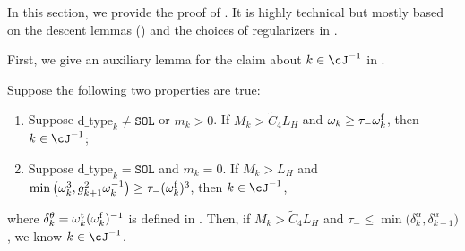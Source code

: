 In this section, we provide the proof of . 
It is highly technical but mostly based on the descent lemmas () and the choices of regularizers in .

First, we give an auxiliary lemma for the claim about $k \in \cJ^{-1}$ in . 
\begin{lemma}
    \label{lem:appendix/decreasing-Mk-condition}
    Suppose the following two properties are true:
    \begin{enumerate}
        \item Suppose $\text{d\_type}_k \neq \texttt{SOL}$ or $m_k > 0$. %
        If $M_k > \tilde C_4 L_H$ and $\omega_k \geq \tau_-\omega_k^{\mathrm{f}}$, then $k \in \cJ^{-1}$;
        \item Suppose $\text{d\_type}_k = \texttt{SOL}$ and $m_k = 0$. 
        If $M_k > L_H$ and 
        $\min\big ( \omega^3_k, g_{k+1}^2 \omega_k^{-1} \big )
        \geq \tau_-(\omega_k^{\mathrm{f}})^3$, then $k \in \cJ^{-1}$,
    \end{enumerate}
    where $\delta_k^\theta = \omega_k^{\mathrm{t}} (\omega_k^{\mathrm{f}})^{-1}$ is defined in .
    Then, if $M_k > \tilde C_4 L_H$ and $\tau_- \leq \min\big ( \delta_k^\alpha, \delta_{k+1}^\alpha \big )$, 
    we know $k \in \cJ^{-1}$.
\end{lemma}
